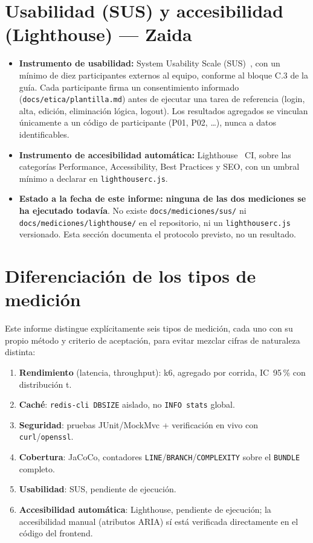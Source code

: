 \section{Usabilidad (SUS) y accesibilidad (Lighthouse) --- Zaida}

\begin{itemize}[nosep]
  \item \textbf{Instrumento de usabilidad:} System Usability Scale
    (SUS)~\cite{sus-brooke1996}, con un m\'inimo de diez participantes externos al equipo,
    conforme al bloque C.3 de la gu\'ia. Cada participante firma un
    consentimiento informado (\texttt{docs/etica/plantilla.md}) antes de
    ejecutar una tarea de referencia (login, alta, edici\'on, eliminaci\'on
    l\'ogica, logout). Los resultados agregados se vinculan \'unicamente a
    un c\'odigo de participante (P01, P02, \ldots), nunca a datos
    identificables.
  \item \textbf{Instrumento de accesibilidad autom\'atica:} Lighthouse~\cite{lighthouse-docs} CI,
    sobre las categor\'ias Performance, Accessibility, Best Practices y
    SEO, con un umbral m\'inimo a declarar en \texttt{lighthouserc.js}.
  \item \textbf{Estado a la fecha de este informe:} \textbf{ninguna de las
    dos mediciones se ha ejecutado todav\'ia}. No existe
    \texttt{docs/mediciones/sus/} ni \texttt{docs/mediciones/lighthouse/}
    en el repositorio, ni un \texttt{lighthouserc.js} versionado. Esta
    secci\'on documenta el protocolo previsto, no un resultado.
\end{itemize}

\section{Diferenciaci\'on de los tipos de medici\'on}

Este informe distingue expl\'icitamente seis tipos de medici\'on, cada uno
con su propio m\'etodo y criterio de aceptaci\'on, para evitar mezclar
cifras de naturaleza distinta:

\begin{enumerate}[nosep]
  \item \textbf{Rendimiento} (latencia, throughput): k6, agregado por
    corrida, IC~95\,\% con distribuci\'on t.
  \item \textbf{Cach\'e}: \texttt{redis-cli DBSIZE} aislado, no
    \texttt{INFO stats} global.
  \item \textbf{Seguridad}: pruebas JUnit/MockMvc + verificaci\'on en vivo
    con \texttt{curl}/\texttt{openssl}.
  \item \textbf{Cobertura}: JaCoCo, contadores \texttt{LINE}/\texttt{BRANCH}/\texttt{COMPLEXITY}
    sobre el \texttt{BUNDLE} completo.
  \item \textbf{Usabilidad}: SUS, pendiente de ejecuci\'on.
  \item \textbf{Accesibilidad autom\'atica}: Lighthouse, pendiente de
    ejecuci\'on; la accesibilidad manual (atributos ARIA) s\'i est\'a
    verificada directamente en el c\'odigo del frontend.
\end{enumerate}
